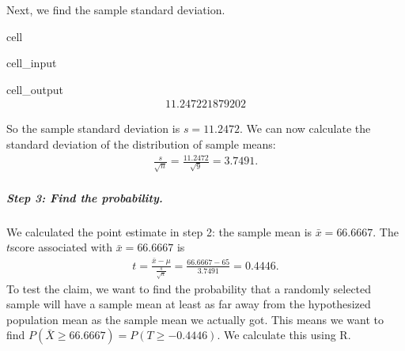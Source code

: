 \documentclass[letterpaper,10pt,english]{jupyterBook}
\begin{document}
\sphinxAtStartPar
Next, we find the sample standard deviation.

\begin{sphinxuseclass}{cell}\begin{sphinxVerbatimInput}

\begin{sphinxuseclass}{cell_input}
\begin{sphinxVerbatim}[commandchars=\\\{\}]
\end{sphinxVerbatim}

\end{sphinxuseclass}\end{sphinxVerbatimInput}
\begin{sphinxVerbatimOutput}

\begin{sphinxuseclass}{cell_output}\begin{equation*}
\begin{split}11.247221879202\end{split}
\end{equation*}
\end{sphinxuseclass}\end{sphinxVerbatimOutput}

\end{sphinxuseclass}
\sphinxAtStartPar
So the sample standard deviation is \(s = 11.2472\). We can now calculate the standard deviation of the distribution of sample means:
\begin{equation*}
\begin{split} \frac{s}{\sqrt{n}} = \frac{11.2472}{\sqrt{9}} = 3.7491. \end{split}
\end{equation*}

\subparagraph{Step 3: Find the probability.}
\label{\detokenize{Ch6 An Introduction to Hypothesis Testing/6.1 An Introduction to Hypothesis Testing:id9}}
\sphinxAtStartPar
We calculated the point estimate in step 2: the sample mean is \(\bar{x} =  66.6667\). The \(t\)\sphinxhyphen{}score associated with \(\bar{x} = 66.6667\) is
\begin{equation*}
\begin{split}t = \frac{\bar{x} - \mu}{\frac{s}{\sqrt{n}}} = \frac{66.6667 - 65}{3.7491} = 0.4446. \end{split}
\end{equation*}
\sphinxAtStartPar
To test the claim, we want to find the probability that a randomly selected sample will have a sample mean at least as far away from the hypothesized population mean as the sample mean we actually got. This means we want to find \(P(\bar{X} \geq 66.6667) = P(T \geq -0.4446)\). We calculate this using R.
\end{document}
